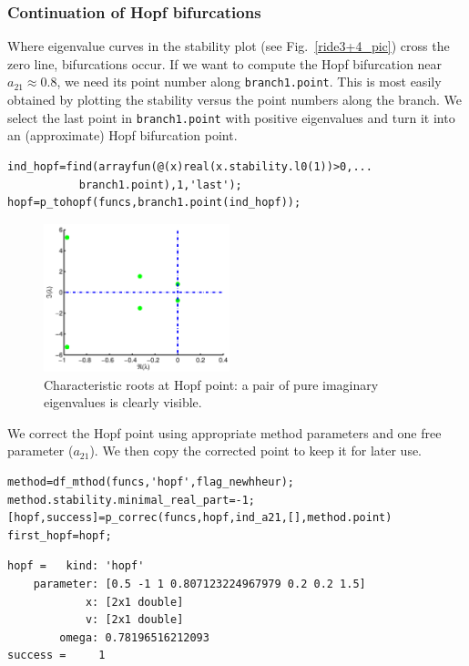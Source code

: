 \documentclass[10pt]{scrartcl}
\newcommand{\blist}[1]{\mbox{\lstinline!#1!}}
\begin{document}
\subsubsection{Continuation of Hopf bifurcations}
\label{sec:hopf}
Where eigenvalue curves in the stability plot (see
Fig.~\ref{ride3+4_pic}) cross the zero line, bifurcations occur. If we
want to compute the Hopf bifurcation near $a_{21}\approx0.8$, we need
its point number along \blist{branch1.point}. This is most easily
obtained by plotting the stability versus the point numbers along the
branch. We select the last point in \blist{branch1.point} with
positive eigenvalues and turn it into an (approximate) Hopf
bifurcation point. 
\begin{lstlisting} 
ind_hopf=find(arrayfun(@(x)real(x.stability.l0(1))>0,...
           branch1.point),1,'last');
hopf=p_tohopf(funcs,branch1.point(ind_hopf));
\end{lstlisting}
\begin{figure}[h]
\begin{center}
  \includegraphics[width=0.48\textwidth]{fig/demo1fig05}
\end{center}
\caption{\label{ride5_pic}Characteristic roots at Hopf
point: a pair of pure imaginary eigenvalues is clearly visible.} 
\end{figure}
We correct the Hopf point using appropriate method parameters
and one free parameter ($a_{21}$). We then copy the corrected point
to keep it for later use.
\begin{lstlisting}
method=df_mthod(funcs,'hopf',flag_newhheur); 
method.stability.minimal_real_part=-1;
[hopf,success]=p_correc(funcs,hopf,ind_a21,[],method.point)
first_hopf=hopf;                   
\end{lstlisting}
{\small
\begin{verbatim}
hopf =   kind: 'hopf'
    parameter: [0.5 -1 1 0.807123224967979 0.2 0.2 1.5]
            x: [2x1 double]
            v: [2x1 double]
        omega: 0.78196516212093
success =     1
\end{verbatim}
}
\end{document}
